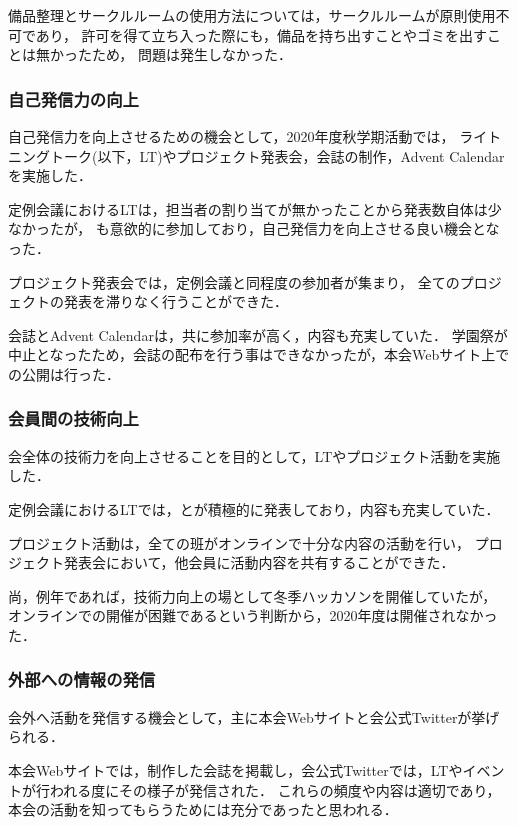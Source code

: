     備品整理とサークルルームの使用方法については，サークルルームが原則使用不可であり，
    許可を得て立ち入った際にも，備品を持ち出すことやゴミを出すことは無かったため，
    問題は発生しなかった．

\subsubsection*{自己発信力の向上}
    自己発信力を向上させるための機会として，2020年度秋学期活動では，
    ライトニングトーク(以下，LT)やプロジェクト発表会，会誌の制作，Advent Calendarを実施した．

    定例会議におけるLTは，担当者の割り当てが無かったことから発表数自体は少なかったが，
    \firstGrade{}も意欲的に参加しており，自己発信力を向上させる良い機会となった．

    プロジェクト発表会では，定例会議と同程度の参加者が集まり，
    全てのプロジェクトの発表を滞りなく行うことができた．

    会誌とAdvent Calendarは，共に参加率が高く，内容も充実していた．
    学園祭が中止となったため，会誌の配布を行う事はできなかったが，本会Webサイト上での公開は行った．

\subsubsection*{会員間の技術向上}
    会全体の技術力を向上させることを目的として，LTやプロジェクト活動を実施した．

    定例会議におけるLTでは，\firstGrade{}と\secondGrade{}が積極的に発表しており，内容も充実していた．

    プロジェクト活動は，全ての班がオンラインで十分な内容の活動を行い，
    プロジェクト発表会において，他会員に活動内容を共有することができた．

    尚，例年であれば，技術力向上の場として冬季ハッカソンを開催していたが，
    オンラインでの開催が困難であるという判断から，2020年度は開催されなかった．

\subsubsection*{外部への情報の発信}
    会外へ活動を発信する機会として，主に本会Webサイトと会公式Twitterが挙げられる．

    本会Webサイトでは，制作した会誌を掲載し，会公式Twitterでは，LTやイベントが行われる度にその様子が発信された．
    これらの頻度や内容は適切であり，本会の活動を知ってもらうためには充分であったと思われる．
